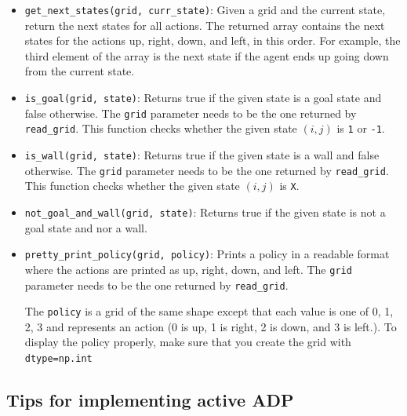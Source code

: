 \documentclass[12pt]{article}
\begin{document}
\begin{itemize}

\item \verb+get_next_states(grid, curr_state)+: Given a grid and the current state, return the next states for all actions. The returned array contains the next states for the actions up, right, down, and left, in this order. For example, the third element of the array is the next state if the agent ends up going down from the current state.

\item \verb+is_goal(grid, state)+: Returns true if the given state is a goal state and false otherwise. The \verb+grid+ parameter needs to be the one returned by \verb+read_grid+. This function checks whether the given state $(i,j)$ is \verb+1+ or \verb+-1+.

\item \verb+is_wall(grid, state)+: Returns true if the given state is a wall and false otherwise. The \verb+grid+ parameter needs to be the one returned by \verb+read_grid+. This function checks whether the given state $(i,j)$ is \verb+X+.

\item \verb+not_goal_and_wall(grid, state)+: Returns true if the given state is not a goal state and nor a wall.

\item \verb+pretty_print_policy(grid, policy)+: Prints a policy in a readable format where the actions are printed as up, right, down, and left. The \verb+grid+ parameter needs to be the one returned by \verb+read_grid+. 

The \verb+policy+ is a grid of the same shape except that each value is one of 0, 1, 2, 3 and represents an action (0 is up, 1 is right, 2 is down, and 3 is left.). To display the policy properly, make sure that you create the grid with \verb+dtype=np.int+ 

\end{itemize}


\subsection{Tips for implementing active ADP}
\label{sec:active_adp}
\end{document}
